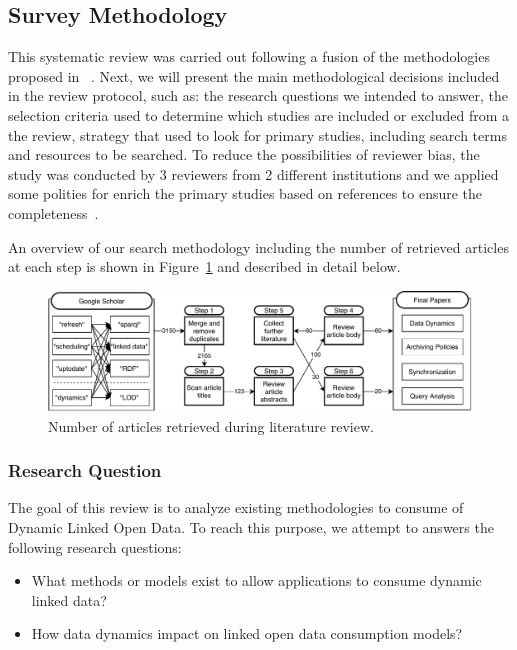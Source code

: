 \documentclass[sw]{iosart2x}
\begin{document}
\subsection{Survey Methodology}\label{Methodology}

This systematic review was carried out following a fusion of the methodologies proposed in ~\cite{keele07, snyder19}. Next, we will present the main methodological decisions included in the review protocol, such as: the research questions we intended to answer, the selection criteria used to determine which studies are included or excluded from a the review, strategy that used to look for primary studies, including search terms and resources to be searched. To reduce the possibilities of reviewer bias, the study was conducted by 3 reviewers from 2 different institutions and we applied some polities for enrich the primary studies based on references to ensure the completeness~\cite{Wohlin14}. 

An overview of our search methodology including the number of retrieved articles at each step is shown in Figure~\ref{fig:methodology} and described in detail below.


\begin{figure}[h]
	\centering
	\includegraphics[scale=0.8]{img/methodology.pdf}
	\caption{Number of articles retrieved during literature review.}
	\label{fig:methodology}
\end{figure}

\subsubsection{Research Question}\label{Question}

The goal of this review is to analyze existing methodologies to consume of Dynamic Linked Open Data. To reach this purpose, we attempt to answers the following research questions: 

\begin{itemize}

\item What methods or models exist to allow applications to consume dynamic linked data? 

\item How data dynamics impact on linked open data consumption models?

\end{itemize}
\end{document}
